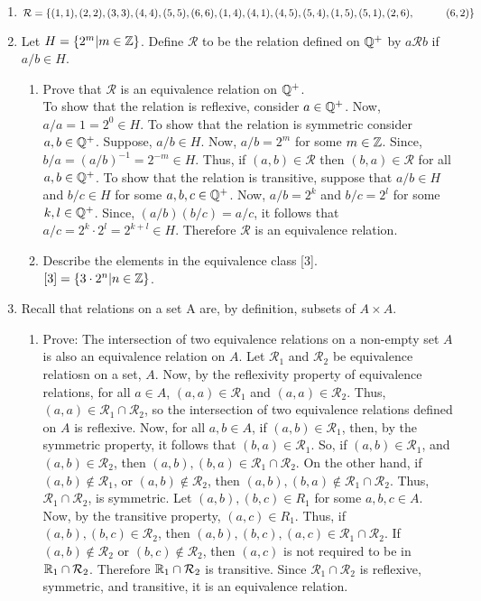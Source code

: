 \documentclass[12pt]{article}
\newcommand{\mc}[1]{\mathcal{#1}}
\begin{document}
\begin{enumerate}
        \item \(\mc R = \{(1,1), (2,2), (3,3), (4,4), (5,5), (6,6), (1,4), (4,1), (4,5), (5,4), (1,5), (5,1), (2,6),\\ ~~~~~~~~~ (6,2)\}\)
        \item Let \(H = \{2^m|m \in \mathbb{Z}\}\). Define \(\mc R\) to be the relation defined on \(\mathbb{Q}^+\) by \(a \mc R b\) if \(a/b \in H\). \begin{enumerate}
            \item Prove that \(\mc R\) is an equivalence relation on \(\mathbb{Q}^+\). \\
            To show that the relation is reflexive, consider \(a\in \mathbb{Q}^+\). Now, \(a/a = 1 = 2^0 \in H\). To show that the relation is symmetric consider \(a, b \in \mathbb{Q}^+\). Suppose, \(a/b\in H\). Now, \(a/b = 2^m\) for some \(m \in \mathbb{Z}\). Since, \(b/a = (a/b)^{-1} = 2^{-m} \in H\). Thus, if \((a,b)\in \mc R\) then \((b,a)\in \mc R\) for all \(a,b \in \mathbb{Q}^+\). To show that the relation is transitive, suppose that \(a/b \in H\) and \(b/c\in H\) for some \(a, b, c\in \mathbb{Q}^+\). Now, \(a/b = 2^k\) and \(b/c = 2^l\) for some \(k, l \in \mathbb{Q}^+\). Since, \((a/b)(b/c) = a/c\), it follows that \(a/c = 2^k\cdot2^l = 2^{k+l}\in H\). Therefore \(\mc R\) is an equivalence relation. 
            \item Describe the elements in the equivalence class [3]. \\ \(\mc [3] = \{3\cdot2^n|n\in \Z\}\). 
        \end{enumerate}
        \item Recall that relations on a set A are, by definition, subsets of \(A\times A\). \begin{enumerate}
            \item {\sc Prove:} The intersection of two equivalence relations on a non-empty set \(A\) is also an equivalence relation on \(A\). Let \(\mc{R}_1\) and \(\mc{R}_2\) be equivalence relatiosn on a set, \(A\). Now, by the reflexivity property of equivalence relations, for all \(a\in A\), \((a, a) \in \mc R_1\) and \((a, a) \in \mc R_2\). Thus, \((a, a)\in \mc R_1\cap \mc R_2\), so the intersection of two equivalence relations defined on \(A\) is reflexive. Now, for all \(a,b\in A\), if \((a, b)\in \mc R_1\), then, by the symmetric property, it follows that \((b, a)\in \mc R_1\). So, if \((a,b) \in \mc R_1\), and \((a,b) \in \mc R_2\), then \((a,b), (b,a)\in\mc R_1\cap\mc R_2\). On the other hand, if \((a,b) \not\in \mc R_1\), or \((a,b) \not\in \mc R_2\), then \((a,b), (b,a) \not\in\mc R_1\cap\mc R_2\). Thus, \(\mc R_1\cap\mc R_2\), is symmetric. Let \((a,b), (b, c)\in R_1\) for some \(a,b,c\in A\). Now, by the transitive property, \((a,c)\in R_1\). Thus, if \((a,b), (b,c)\in \mc R_2\), then \((a,b), (b,c), (a,c) \in \mc R_1\cap\mc R_2\). If \((a,b)\not \in \mc R_2\) or \((b,c)\not\in \mc R_2\), then \((a,c)\) is not required to be in \(\mc \R_1\cap \mc R_2\). Therefore \(\mc \R_1\cap \mc R_2\) is transitive. Since \(\mc R_1 \cap \mc R_2\) is reflexive, symmetric, and transitive, it is an equivalence relation.

\end{enumerate}
\end{enumerate}
\end{document}
